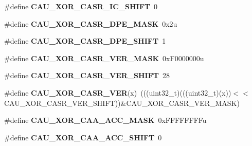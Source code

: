 \begin{DoxyCompactItemize}
\item 
\#define {\bfseries C\+A\+U\+\_\+\+X\+O\+R\+\_\+\+C\+A\+S\+R\+\_\+\+I\+C\+\_\+\+S\+H\+I\+FT}~0\hypertarget{group__CAU__Register__Masks_ga371852a2013f6f7d79b8fcd434367358}{}\label{group__CAU__Register__Masks_ga371852a2013f6f7d79b8fcd434367358}

\item 
\#define {\bfseries C\+A\+U\+\_\+\+X\+O\+R\+\_\+\+C\+A\+S\+R\+\_\+\+D\+P\+E\+\_\+\+M\+A\+SK}~0x2u\hypertarget{group__CAU__Register__Masks_ga71d1db03ca6c06a051297201f2e8d855}{}\label{group__CAU__Register__Masks_ga71d1db03ca6c06a051297201f2e8d855}

\item 
\#define {\bfseries C\+A\+U\+\_\+\+X\+O\+R\+\_\+\+C\+A\+S\+R\+\_\+\+D\+P\+E\+\_\+\+S\+H\+I\+FT}~1\hypertarget{group__CAU__Register__Masks_ga2c2901b4531d55d9625468c78cea25b0}{}\label{group__CAU__Register__Masks_ga2c2901b4531d55d9625468c78cea25b0}

\item 
\#define {\bfseries C\+A\+U\+\_\+\+X\+O\+R\+\_\+\+C\+A\+S\+R\+\_\+\+V\+E\+R\+\_\+\+M\+A\+SK}~0x\+F0000000u\hypertarget{group__CAU__Register__Masks_ga1ac156673986e2dc85b9d9491a3d4bf2}{}\label{group__CAU__Register__Masks_ga1ac156673986e2dc85b9d9491a3d4bf2}

\item 
\#define {\bfseries C\+A\+U\+\_\+\+X\+O\+R\+\_\+\+C\+A\+S\+R\+\_\+\+V\+E\+R\+\_\+\+S\+H\+I\+FT}~28\hypertarget{group__CAU__Register__Masks_ga935619a005c89a213ef4df90046e2802}{}\label{group__CAU__Register__Masks_ga935619a005c89a213ef4df90046e2802}

\item 
\#define {\bfseries C\+A\+U\+\_\+\+X\+O\+R\+\_\+\+C\+A\+S\+R\+\_\+\+V\+ER}(x)~(((uint32\+\_\+t)(((uint32\+\_\+t)(x))$<$$<$C\+A\+U\+\_\+\+X\+O\+R\+\_\+\+C\+A\+S\+R\+\_\+\+V\+E\+R\+\_\+\+S\+H\+I\+FT))\&C\+A\+U\+\_\+\+X\+O\+R\+\_\+\+C\+A\+S\+R\+\_\+\+V\+E\+R\+\_\+\+M\+A\+SK)\hypertarget{group__CAU__Register__Masks_gad0d12a99e05798ea2c6cd22d02b0752a}{}\label{group__CAU__Register__Masks_gad0d12a99e05798ea2c6cd22d02b0752a}

\item 
\#define {\bfseries C\+A\+U\+\_\+\+X\+O\+R\+\_\+\+C\+A\+A\+\_\+\+A\+C\+C\+\_\+\+M\+A\+SK}~0x\+F\+F\+F\+F\+F\+F\+F\+Fu\hypertarget{group__CAU__Register__Masks_gad749b4e76ae58d704efbe7be8c9fd935}{}\label{group__CAU__Register__Masks_gad749b4e76ae58d704efbe7be8c9fd935}

\item 
\#define {\bfseries C\+A\+U\+\_\+\+X\+O\+R\+\_\+\+C\+A\+A\+\_\+\+A\+C\+C\+\_\+\+S\+H\+I\+FT}~0\hypertarget{group__CAU__Register__Masks_gabce35c8c48d54d7175820c3a5f0b120c}{}\label{group__CAU__Register__Masks_gabce35c8c48d54d7175820c3a5f0b120c}


\end{DoxyCompactItemize}
